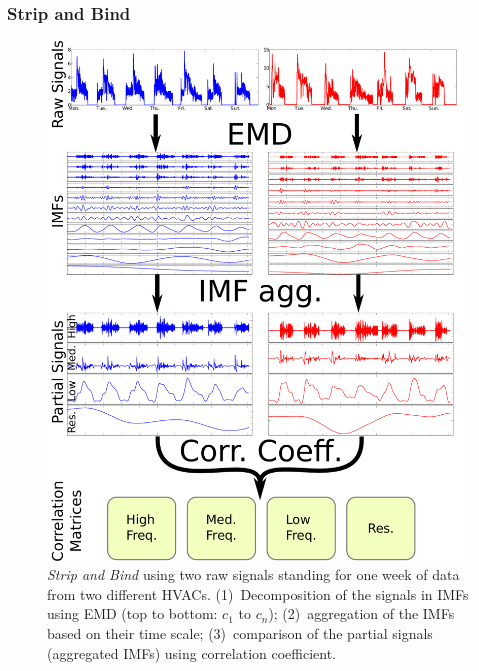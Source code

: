 


\subsubsection{Strip and Bind} \label{methodo:est}

\begin{figure}[t!]
\begin{center}
 \includegraphics[width=.5\textwidth]{figs/estimator.pdf}
 \caption{\emph{Strip and Bind} using two raw signals standing for one week of data from two different HVACs. (1)~Decomposition of the signals in IMFs using EMD (top to bottom: $c_1$ to $c_n$); (2)~aggregation of the IMFs based on their time scale; (3)~comparison of the partial signals (aggregated IMFs) using correlation coefficient.}
 \label{fig:diagram1}
 \end{center}
\end{figure}

